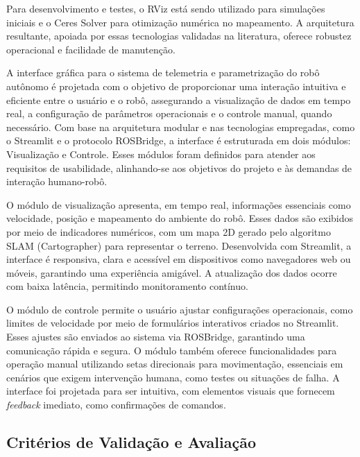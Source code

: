 Para desenvolvimento e testes, o RViz\cite{rviz_wiki} está sendo utilizado para simulações iniciais e o Ceres Solver\cite{Ceres} para otimização numérica no mapeamento. A arquitetura resultante, apoiada por essas tecnologias validadas na literatura, oferece robustez operacional e facilidade de manutenção.


A interface gráfica para o sistema de telemetria e parametrização do robô autônomo é projetada com o objetivo de proporcionar uma interação intuitiva e eficiente entre o usuário e o robô, assegurando a visualização de dados em tempo real, a configuração de parâmetros operacionais e o controle manual, quando necessário. Com base na arquitetura modular e nas tecnologias empregadas, como o Streamlit e o protocolo ROSBridge, a interface é estruturada em dois módulos: Visualização e Controle. Esses módulos foram definidos para atender aos requisitos de usabilidade, alinhando-se aos objetivos do projeto e às demandas de interação humano-robô.

O módulo de visualização apresenta, em tempo real, informações essenciais como velocidade, posição e mapeamento do ambiente do robô. Esses dados são exibidos por meio de indicadores numéricos, com um mapa 2D gerado pelo algoritmo SLAM (Cartographer)\cite{Cartographer} para representar o terreno. Desenvolvida com Streamlit, a interface é responsiva, clara e acessível em dispositivos como navegadores web ou móveis, garantindo uma experiência amigável. A atualização dos dados ocorre com baixa latência, permitindo monitoramento contínuo.

O módulo de controle permite o usuário ajustar configurações operacionais, como limites de velocidade por meio de formulários interativos criados no Streamlit. Esses ajustes são enviados ao sistema via ROSBridge, garantindo uma comunicação rápida e segura. O módulo também oferece funcionalidades para operação manual utilizando setas direcionais para movimentação, essenciais em cenários que exigem intervenção humana, como testes ou situações de falha. A interface foi projetada para ser intuitiva, com elementos visuais que fornecem \textit{feedback} imediato, como confirmações de comandos. 

\subsection{Critérios de Validação e Avaliação}

